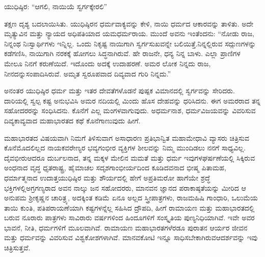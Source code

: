 \vskip 0.1cm

ಯುಧಿಷ್ಠಿರ: “ಆಗಲಿ, ನಾಯಿಯೆ ಸ್ವರ್ಗಕ್ಕೇರಲಿ”

\vskip 0.1cm

ತಕ್ಷಣ ದೃಶ್ಯ ಬದಲಾಯಿಸಿತು. ಯುಧಿಷ್ಠಿರನ ಧರ್ಮವಾಕ್ಯವನ್ನು ಕೇಳಿ, ನಾಯಿ ಧರ್ಮದ ಆಕಾರವನ್ನು ತಾಳಿತು. ಅದೇ ಮೃತ್ಯುವಿನ ಮತ್ತು ನ್ಯಾಯದ ಅಧಿಪತಿಯಾದ ಯಮಧರ್ಮರಾಯ. ಮುಂದೆ ಅವನು ಇಂತೆಂದನು: “ನೋಡು ರಾಜ, ನಿನ್ನಂಥ ನಿಃಸ್ವಾರ್ಥಿಗಳು ಇನ್ನಿಲ್ಲ. ಒಂದು ನಿಕೃಷ್ಟ ನಾಯಿಗಾಗಿ ಸ್ವರ್ಗಸುಖವನ್ನೇ ಬಲಿಯಿತ್ತೆ.\break ನಿನ್ನಲ್ಲಿರುವ ಸದ್ಗುಣಗಳನ್ನು ಕಡೆಗಣಿಸಿ, ನಾಯಿಗಾಗಿ ನರಕಕ್ಕೆ ಹೋಗಲು ಸಿದ್ಧ\-ನಾಗಿರುವೆ. ಹೇ ರಾಜನೇ, ಧನ್ಯ ನಿನ್ನ ಬಾಳು. ಎಲ್ಲಾ ಪ್ರಾಣಿಗಳ ಮೇಲೂ ನಿನಗೆ ಕರುಣೆಯಿದೆ. ಇದೊಂದು ಅದಕ್ಕೆ ಉದಾಹರಣೆ. ಅಮರ ಲೋಕ ನಿನ್ನದು ರಾಜ, ನೀನದನ್ನು\break ಸಂಪಾದಿಸಿರುವೆ. ಅಮೃತ ಸ್ವರೂಪವಾದ ದಿವ್ಯವಾದ ಗುರಿ ನಿನ್ನದು.”

\vskip 0.1cm

ಅನಂತರ ಯುಧಿಷ್ಠಿರ ಧರ್ಮ ಮತ್ತು ಇತರ ದೇವತೆಗಳೊಡನೆ ಪುಷ್ಪಕ ವಿಮಾನದಲ್ಲಿ ಸ್ವರ್ಗವನ್ನು ಸೇರಿದರು. ದಾರಿಯಲ್ಲಿ ಸ್ವಲ್ಪ ಕಷ್ಟ ಅನುಭವಿಸಿ ಅಮರ ನದಿಯಲ್ಲಿ ಮಿಂದು ಹೊಸ ದೇಹವನ್ನು ಧರಿಸಿದನು. ಈಗ ಅಮರರಾದ ತನ್ನ ಸಹೋದರರನ್ನು ಸಂಧಿಸಿದನು. ಕೊನೆಗೆ ಎಲ್ಲ ಮಂಗಳವಾಗುವುದು. ಅಧರ್ಮನಾಶ, ಧರ್ಮವಿಜಯವನ್ನು ವಿವರಿಸುವ ದಿವ್ಯಕಾವ್ಯವಾದ ಮಹಾಭಾರತದ ಕಥೆ ಕೊನೆಗಾಣುವುದು ಹೀಗೆ.

ಮಹಾಭಾರತದ ವಿಷಯವಾಗಿ ನಿಮಗೆ ತಿಳಿಸುವಾಗ ಅಸಾಧಾರಣ ಪ್ರತಿಭಾನ್ವಿತ ಮಹಾಮೇಧಾವಿ ವ್ಯಾಸರು ಚಿತ್ರಿಸುವ ಕೊನೆಮೊದಲಿಲ್ಲದ ನಾಯಕವರೇಣ್ಯರ ಭವ್ಯಗಂಭೀರ ವ್ಯಕ್ತಿಗಳ ಶೀಲವನ್ನು ನಿಮ್ಮ ಮುಂದಿಡಲು ನನಗೆ ಸಾಧ್ಯವಿಲ್ಲ. ದೈವಭೀರು\break ಆದರೂ ದುರ್ಬಲನಾದ, ತನ್ನ ಮಕ್ಕಳ ಮೇಲಿನ ಮಮತೆ ಮತ್ತು ಧರ್ಮ ಇವುಗಳ\break ಘರ್ಷಣೆಯಲ್ಲಿ ಸಿಕ್ಕಿರುವ ಅಂಧನಾದ ವೃದ್ಧ ಧೃತರಾಷ್ಟ್ರ, ಹೈಮಾಚಲ ಸದೃಶ\break ಗಾಂಭೀರ್ಯದಿಂದ ಕೂಡಿದವನಾದ ಭೀಷ್ಮ ಪಿತಾಮಹ, ಧರ್ಮಾತ್ಮನಾದ ಉದಾತ್ತ\break ಯುಧಿಷ್ಠಿರ ಮತ್ತು ಶೌರ್ಯದಲ್ಲಿ ಹೇಗೆ ಅಪ್ರತಿಮರೋ ಹಾಗೆಯೇ ಶ್ರದ್ಧೆ ಭಕ್ತಿಗಳಲ್ಲಿ\break ಅಗ್ರಗಣ್ಯರಾದ ಅವನ ನಾಲ್ಕು ಜನ ಸಹೋದರರು, ಮಾನವನ ಜ್ಞಾನದ ಪರಾಕಾಷ್ಠತೆಯನ್ನು ಮೀರಿದ ಆ ಅನುಪಮ ಶ‍್ರೀಕೃಷ್ಣನ ಚಾರಿತ್ರ್ಯ, ಅದಕ್ಕಿಂತ ಕಡಿಮೆ ಏನೂ ಅಲ್ಲದ ಸ್ತ್ರೀಪಾತ್ರಗಳು, ರಾಜಮಹಿಷಿ ಗಾಂಧಾರಿ, ಒಲುಮೆಯ ತಾಯಿ ಕುಂತಿ, ಪತಿಪರಾಯಣೆ\-ಯಾಗಿ ಕಷ್ಟಗಳನ್ನೆಲ್ಲ ಸಹಿಸಿದ ದ್ರೌಪದಿ, ಹೀಗೆ ರಾಮಾಯಣ ಮತ್ತು ಮಹಾಭಾರತದಲ್ಲಿ ಬರುವ ನೂರಾರು ಪಾತ್ರಗಳು ಸಾವಿರಾರು ವರ್ಷಗಳಿಂದ ಹಿಂದೂಗಳಿಗೆ ಸಂಸ್ಕೃತಿಯ ಪುಣ್ಯನಿಧಿಯಾಗಿವೆ. ಇವೇ ಅವರ ಭಾವನೆ, ನೀತಿ, ಧರ್ಮಗಳಿಗೆ ಮೂಲವಾಗಿವೆ. ರಾಮಾಯಣ ಮಹಾಭಾರತಗಳೆರಡೂ ಪುರಾತನ ಆರ್ಯರ ಜೀವನ ಮತ್ತು ಧರ್ಮವನ್ನು ವಿವರಿಸುವ ವಿಶ್ವಕೋಶಗಳಾಗಿವೆ. ಮಾನವಕೋಟಿ ಇನ್ನೂ ಸಾಧಿಸಬೇಕಾಗಿರುವ\break ಆದರ್ಶವನ್ನು ಇವು ಚಿತ್ರಿಸುತ್ತವೆ.

